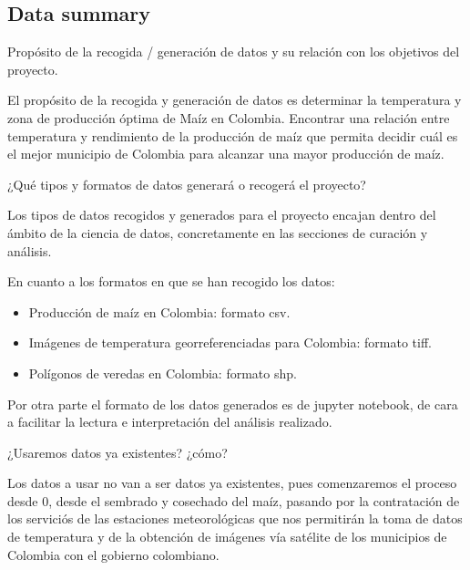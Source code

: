 \documentclass[12pt, spanish]{article}
\begin{document}
\subsection{Data summary}

\begin{shaded}
Propósito de la recogida / generación de datos y su relación con los objetivos del proyecto.
\end{shaded}

El propósito de la recogida y generación de datos es determinar la temperatura y zona de producción óptima de Maíz en Colombia.
Encontrar una relación entre temperatura y rendimiento de la producción de maíz que permita decidir cuál es el mejor municipio de Colombia para alcanzar una mayor producción de maíz.\\

\begin{shaded}
¿Qué tipos y formatos de datos generará o recogerá  el proyecto?

\end{shaded}

Los tipos de datos recogidos  y generados para el proyecto encajan dentro del ámbito de la ciencia de datos, concretamente en las secciones de curación y análisis.

En cuanto a los formatos en que se han recogido los datos:

\begin{itemize}
    \item Producción de maíz en Colombia: formato csv.
    \item Imágenes de temperatura georreferenciadas para Colombia: formato tiff.
    \item Polígonos de veredas en Colombia: formato shp.
\end{itemize}

Por otra parte el formato de los datos generados es de jupyter notebook, de cara a facilitar la lectura e interpretación del análisis realizado.


\begin{shaded}
¿Usaremos datos ya existentes? ¿cómo?
\end{shaded}
Los datos a usar no van a ser datos ya existentes, pues comenzaremos el proceso desde 0, desde el sembrado y cosechado del maíz, pasando por la contratación de los serviciós de las estaciones meteorológicas  que nos permitirán la toma de datos de temperatura y de la obtención de imágenes vía satélite de los municipios de Colombia con el gobierno colombiano.
\end{document}
